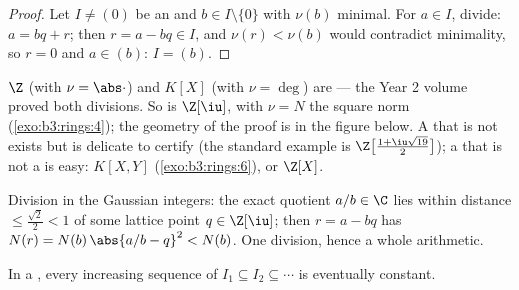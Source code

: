 \begin{proof}
Let $I \neq (0)$ be an  and $b \in I \setminus\{0\}$ with
$\nu(b)$ minimal. For $a \in I$, divide: $a = bq + r$; then $r = a
- bq \in I$, and $\nu(r) < \nu(b)$ would contradict minimality, so
$r = 0$ and $a \in (b)$: $I = (b)$.
\end{proof}

\begin{example}\label{ex:b3:rings:euclidean}
$\Z$ (with $\nu = \abs\cdot$) and $K[X]$ (with $\nu = \deg$) are
 --- the Year 2 volume proved both divisions. So is
$\Z[\iu]$, with $\nu = N$ the square norm
(\cref{exo:b3:rings:4}); the geometry of the proof is in the
figure below. A  that is not  exists but is delicate
to certify (the standard example is
$\Z\bigl[\frac{1+\iu\sqrt{19}}2\bigr]$); a  that is not a 
is easy: $K[X, Y]$ (\cref{exo:b3:rings:6}), or $\Z[X]$.
\end{example}

\begin{omfigure}

{\small Division in the Gaussian integers: the exact quotient
$a/b \in \C$ lies within distance $\leq \frac{\sqrt2}{2} < 1$ of
some lattice point $q \in \Z[\iu]$; then $r = a - bq$ has $N(r) =
N(b)\,\abs{a/b - q}^2 < N(b)$. One  division, hence a
whole arithmetic.}
\end{omfigure}

\begin{lemma}
\label{lem:b3:rings:acc}
In a , every increasing sequence of  $I_1 \subseteq I_2
\subseteq \cdots$ is eventually constant.
\end{lemma}

